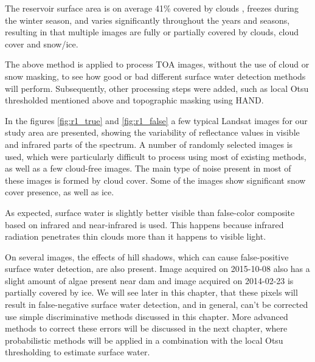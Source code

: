 The reservoir surface area is on average 41\% covered by clouds \cite{wilson2016remotely}, freezes during the winter season, and varies significantly throughout the years and seasons, resulting in that multiple images are fully or partially covered by clouds, cloud cover and snow/ice.

The above method is applied to process TOA images, without the use of cloud or snow masking, to see how good or bad different surface water detection methods will perform. Subsequently, other processing steps were added, such as local Otsu thresholded mentioned above and topographic masking using HAND. 


In the figures \ref{fig:r1_true} and \ref{fig:r1_false} a few typical Landsat images for our study area are presented, showing the variability of reflectance values in visible and infrared parts of the spectrum. A number of randomly selected images is used, which were particularly difficult to process using most of existing methods, as well as a few cloud-free images. The main type of noise present in most of these images is formed by cloud cover. Some of the images show significant snow cover presence, as well as ice. 

As expected, surface water is slightly better visible than false-color composite based on infrared and near-infrared is used. This happens because infrared radiation penetrates thin clouds more than it happens to visible light. 

On several images, the effects of hill shadows, which can cause false-positive surface water detection, are also present. Image acquired on 2015-10-08 also has a slight amount of algae present near dam and image acquired on 2014-02-23 is partially covered by ice. We will see later in this chapter, that these pixels will result in false-negative surface water detection, and in general, can't be corrected use simple discriminative methods discussed in this chapter. More advanced methods to correct these errors will be discussed in the next chapter, where probabilistic methods will be applied in a combination with the local Otsu thresholding to estimate surface water.


